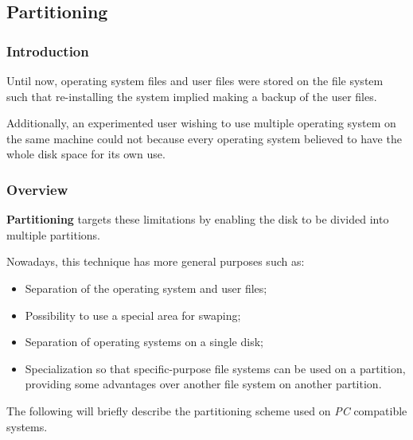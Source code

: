 
\subsection{Partitioning}


\begin{frame}
  \frametitle{Introduction}

  Until now, operating system files and user files were stored on the
  file system such that re-installing the system implied making a backup
  of the user files.

  \-

  Additionally, an experimented user wishing to use multiple operating system
  on the same machine could not because every operating system believed
  to have the whole disk space for its own use.
\end{frame}


\begin{frame}
  \frametitle{Overview}

  \textbf{Partitioning} targets these limitations by enabling the disk to
  be divided into multiple partitions.

  \-

  Nowadays, this technique has more general purposes such as:

  \begin{itemize}
    \item
      Separation of the operating system and user files;
    \item
      Possibility to use a special area for swaping;
    \item
      Separation of operating systems on a single disk;
    \item
      Specialization so that specific-purpose file systems can be used
      on a partition, providing some advantages over another file system on
      another partition.
  \end{itemize}

  \-

  The following will briefly describe the partitioning scheme used on
  \textit{PC} compatible systems.
\end{frame}


